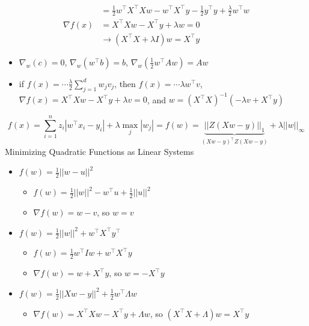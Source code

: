 \documentclass[10pt,landscape,a4paper]{article}
\begin{document}
\begin{multicols*}{5}
\begin{align*}
    &= \frac{1}{2} w^\intercal X^\intercal Xw - w^\intercal X^\intercal y - \frac{1}{2} y^\intercal y + \frac{\lambda}{2} w^\intercal w \\
    \nabla f(x) &= X^\intercal Xw - X^\intercal y + \lambda w = 0 \\
    & \rightarrow (X^\intercal X + \lambda I) w = X^\intercal y
\end{align*}
\begin{itemize}
    \item \(\nabla_w (c) = 0\), \(\nabla_w (w^\intercal b) = b\), \(\nabla_w (\frac{1}{2} w^\intercal A w) = Aw\)
\end{itemize}
\begin{itemize}
    \item if \(f(x) = \cdots \frac{\lambda}{2} \sum\limits_{j=1}^{d} w_j v_j\), then \(f(x) = \cdots \lambda w^\intercal v\), \(\nabla f(x) = X^\intercal Xw - X^\intercal y + \lambda v = 0\), and \(w = (X^\intercal X)^{-1} (- \lambda v + X^\intercal y)\)
\end{itemize}
\begin{dmath*}
    f(x) = \sum\limits_{i=1}^{n} z_i |w^\intercal x_i - y_i| + \lambda \max_j |w_j|
    = f(w) = \underbrace{||Z(Xw - y)||_1}_{(Xw-y)^\intercal Z (Xw-y)} + \lambda ||w||_{\infty}
\end{dmath*}
Minimizing Quadratic Functions as Linear Systems
\begin{itemize}
    \item \(f(w) = \frac{1}{2} ||w-u||^2\)
    \begin{itemize}
        \item \(f(w) = \frac{1}{2} ||w||^2 -w^\intercal u + \frac{1}{2} ||u||^2\)
        \item \(\nabla f(w) = w-v\), so \(w = v\)
    \end{itemize}
    \item \(f(w) = \frac{1}{2} ||w||^2 + w^\intercal X^\intercal y^\intercal\)
    \begin{itemize}
        \item \(f(w) = \frac{1}{2} w^\intercal I w + w^\intercal X^\intercal y\)
        \item \(\nabla f(w) = w + X^\intercal y\), so \(w=-X^\intercal y\)
    \end{itemize}
    \item \(f(w) = \frac{1}{2} ||Xw-y||^2 + \frac{1}{2} w^\intercal \Lambda w\)
    \begin{itemize}
        \item \(\nabla f(w) = X^\intercal X w - X^\intercal y + \Lambda w\), so \((X^\intercal X + \Lambda)w = X^\intercal y\)

\end{itemize}
\end{itemize}
\end{multicols*}
\end{document}
